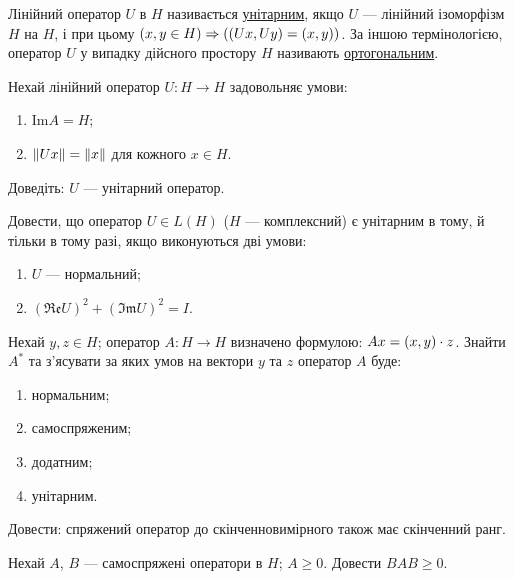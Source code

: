 \begin{theory}
    Лінійний оператор $U$ в $H$ називається \uline{унітарним}, якщо
    $U$ --- лінійний ізоморфізм $H$ на $H$, і при цьому $(x, y \in H) \Rightarrow 
    \left(\left(Ux, Uy\right) = \left(x, y\right)\right)$. За іншою термінологією, оператор
    $U$ у випадку дійсного простору $H$ називають \uline{ортогональним}.
\end{theory}

\begin{exercise}
    Нехай лінійний оператор $U:H \to H$ задовольняє умови:
    \begin{enumerate}[label=\ukr*)]
        \item $\mathrm{Im}A = H$;
        \item $\left\lVert Ux\right\rVert = \left\lVert x\right\rVert$ для кожного $x \in H$.
    \end{enumerate}
    Доведіть: $U$ --- унітарний оператор.
\end{exercise}

\begin{exercise}
    Довести, що оператор $U \in L(H)$ ($H$ --- комплексний) є унітарним в тому,
    й тільки в тому разі, якщо виконуються дві умови:
    \begin{enumerate}[label=\ukr*)]
        \item $U$ --- нормальний;
        \item $(\mathfrak{Re}U)^2 + (\mathfrak{Im}U)^2 = I$.
    \end{enumerate}
\end{exercise}

\begin{exercise}
    Нехай $y, z \in H$; оператор $A: H \to H$ визначено формулою: $Ax = \left(x, y\right) \cdot z$.
    Знайти $A^*$ та з'ясувати за яких умов на вектори $y$ та $z$ оператор $A$ буде:
    \begin{enumerate}[label=\ukr*)]
        \item нормальним;
        \item самоспряженим;
        \item додатним;
        \item унітарним.
    \end{enumerate}
\end{exercise}

\begin{exercise}
    Довести: спряжений оператор до скінченновимірного також має скінченний ранг.
\end{exercise}

\begin{exercise}
    Нехай $A$, $B$ --- самоспряжені оператори в $H$; $A \geq 0$.
    Довести $BAB \geq 0$.
\end{exercise}
